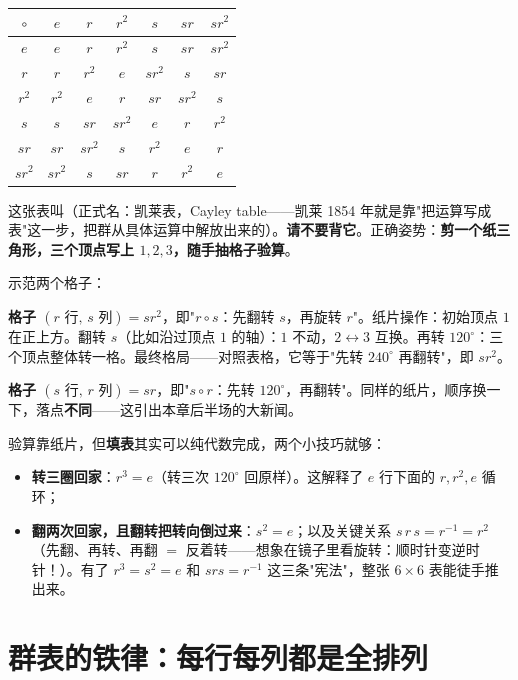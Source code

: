\begin{center}
\renewcommand{\arraystretch}{1.3}
\begin{tabular}{c|cccccc}
$\circ$ & $e$ & $r$ & $r^2$ & $s$ & $sr$ & $sr^2$ \\
\hline
$e$    & $e$    & $r$    & $r^2$  & $s$    & $sr$    & $sr^2$ \\
$r$    & $r$    & $r^2$  & $e$    & $sr^2$ & $s$     & $sr$   \\
$r^2$  & $r^2$  & $e$    & $r$    & $sr$   & $sr^2$  & $s$    \\
$s$    & $s$    & $sr$   & $sr^2$ & $e$    & $r$     & $r^2$  \\
$sr$   & $sr$   & $sr^2$ & $s$    & $r^2$  & $e$     & $r$    \\
$sr^2$ & $sr^2$ & $s$    & $sr$   & $r$    & $r^2$   & $e$    \\
\end{tabular}
\end{center}

这张表叫（正式名：凯莱表，Cayley table——凯莱 1854 年就是靠"把运算写成表"这一步，把群从具体运算中解放出来的）。\textbf{请不要背它}。正确姿势：\textbf{剪一个纸三角形，三个顶点写上 $1,2,3$，随手抽格子验算}。

示范两个格子：

\textbf{格子 $(r \text{ 行},\, s \text{ 列}) = sr^2$}，即"$r\circ s$：先翻转 $s$，再旋转 $r$"。纸片操作：初始顶点 $1$ 在正上方。翻转 $s$（比如沿过顶点 $1$ 的轴）：$1$ 不动，$2\leftrightarrow3$ 互换。再转 $120^\circ$：三个顶点整体转一格。最终格局——对照表格，它等于"先转 $240^\circ$ 再翻转"，即 $sr^2$。\checkmark

\textbf{格子 $(s \text{ 行},\, r \text{ 列}) = sr$}，即"$s\circ r$：先转 $120^\circ$，再翻转"。同样的纸片，顺序换一下，落点\textbf{不同}——这引出本章后半场的大新闻。

验算靠纸片，但\textbf{填表}其实可以纯代数完成，两个小技巧就够：
\begin{itemize}
\item \textbf{转三圈回家}：$r^3 = e$（转三次 $120^\circ$ 回原样）。这解释了 $e$ 行下面的 $r, r^2, e$ 循环；
\item \textbf{翻两次回家，且翻转把转向倒过来}：$s^2 = e$；以及关键关系 $s\,r\,s = r^{-1} = r^2$（先翻、再转、再翻 $=$ 反着转——想象在镜子里看旋转：顺时针变逆时针！）。有了 $r^3 = s^2 = e$ 和 $srs = r^{-1}$ 这三条"宪法"，整张 $6\times6$ 表能徒手推出来。
\end{itemize}

\section{群表的铁律：每行每列都是全排列}

